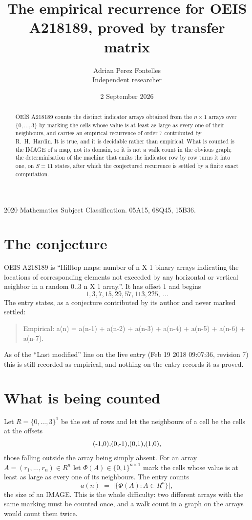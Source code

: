 \documentclass[11pt,a4paper]{article}
\title{The empirical recurrence for OEIS A218189, proved by transfer matrix}
\author{Adrian Perez Fontelles\\ \small Independent researcher}
\date{2 September 2026}
\theoremstyle{plain}
\theoremstyle{definition}
\begin{document}
\maketitle

\begin{abstract}
OEIS A218189 counts the distinct indicator arrays obtained from the $n\times1$ arrays over
$\{0,\dots,3\}$ by marking the cells whose value is at least as large as every one of their neighbours, and carries an
empirical recurrence of order $7$ contributed by R.~H.~Hardin. It is true, and it is
decidable rather than empirical. What is counted is the IMAGE of a map, not its domain, so it
is not a walk count in the obvious graph; the determinisation of the machine that emits the
indicator row by row turns it into one, on $S=11$ states, after which the conjectured
recurrence is settled by a finite exact computation.
\end{abstract}

\noindent\small 2020 Mathematics Subject Classification. 05A15, 68Q45, 15B36.\normalsize

\section{The conjecture}

OEIS A218189 is ``Hilltop maps: number of n X 1 binary arrays indicating the locations of corresponding elements not exceeded by any horizontal or vertical neighbor in a random 0..3 n X 1 array.''. It has offset $1$ and begins
\[
1, 3, 7, 15, 29, 57, 113, 225,\ \dots
\]
The entry states, as a conjecture contributed by its author and never marked settled:
\begin{quote}
Empirical: a(n) = a(n-1) + a(n-2) + a(n-3) + a(n-4) + a(n-5) + a(n-6) + a(n-7).
\end{quote}
As of the ``Last modified'' line on the live entry (Feb 19 2018 09:07:36, revision 7) this is still
recorded as empirical, and nothing on the entry records it as proved.

\section{What is being counted}

Let $R=\{0,\dots,3\}^{1}$ be the set of rows and let the neighbours of a cell be the
cells at the offsets
\[
$(-1,0)$, $(0,-1)$, $(0,1)$, $(1,0)$,
\]
those falling outside the array being simply absent. For an array
$A=(r_1,\dots,r_n)\in R^n$ let $\Phi(A)\in\{0,1\}^{n\times1}$ mark the cells whose value
is at least as large as every one of its neighbours. The entry counts
\[
a(n)\;=\;\bigl|\{\Phi(A):A\in R^n\}\bigr| ,
\]
the size of an IMAGE. This is the whole difficulty: two different arrays with the same marking
must be counted once, and a walk count in a graph on the arrays would count them twice.
\end{document}
